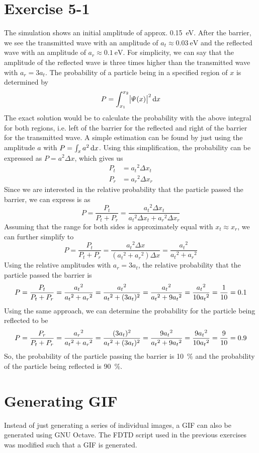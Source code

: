 \clearpage



\newpage
\section{Exercise 5-1}

The simulation shows an initial amplitude of approx. \SI{0.15}{\eV}. After
the barrier, we see the transmitted wave with an amplitude of
$a_t \approx \SI{0.03}{\eV}$ and the reflected wave with an amplitude of
$a_r \approx \SI{0.1}{\eV}$. For simplicity, we can say that the amplitude
of the reflected wave is three times higher than the transmitted wave with
$a_r = 3 a_t$.
%
The probability of a particle being in a specified region of $x$ is
determined by
%
\[
	P = \int_{x_1}^{x_2} \abs{\varPsi(x)}^2 \dif x
\]
%
The exact solution would be to calculate the probability with the above
integral for both regions, i.e. left of the barrier for the reflected and
right of the barrier for the transmitted wave. A simple estimation can be
found by just using the amplitude $a$ with $P = \int_{x} a^2 \dif x$. Using
this simplification, the probability can be expressed as $P = a^2 \Delta x$,
which gives us
\begin{align*}
	P_t &= {a_t}^2 \Delta x_t \\
	P_r &= {a_r}^2 \Delta x_r
\end{align*}
Since we are interested in the relative probability that the particle passed
the barrier, we can express is as
\[
	P
	= \frac{P_t}{P_t + P_r}
	= \frac{{a_t}^2 \Delta x_t}{{a_t}^2 \Delta x_t + {a_r}^2 \Delta x_r}
\]
Assuming that the range for both sides is approximately equal with
$x_t \approx x_r$, we can further simplify to
\[
	P
	= \frac{P_t}{P_t + P_r}
	= \frac{{a_t}^2 \Delta x}{({a_t}^2 + {a_r}^2) \Delta x}
	= \frac{{a_t}^2}{{a_t}^2 + {a_r}^2}
\]
Using the relative amplitudes with $a_r = 3 a_t$, the relative probability
that the particle passed the barrier is
\[
	P
	= \frac{P_t}{P_t + P_r}
	= \frac{{a_t}^2}{{a_t}^2 + {a_r}^2}
	= \frac{{a_t}^2}{{a_t}^2 + (3 a_t)^2}
	= \frac{{a_t}^2}{{a_t}^2 + 9 {a_t}^2}
	= \frac{{a_t}^2}{10 {a_t}^2}
	= \frac{1}{10}
	= 0.1 \\
\]
Using the same approach, we can determine the probability for the particle
being reflected to be
\[
	P
	= \frac{P_r}{P_t + P_r}
	= \frac{{a_r}^2}{{a_t}^2 + {a_r}^2}
	= \frac{(3 a_t)^2}{{a_t}^2 + (3 a_t)^2}
	= \frac{9 {a_t}^2}{{a_t}^2 + 9 {a_t}^2}
	= \frac{9 {a_t}^2}{10 {a_t}^2}
	= \frac{9}{10}
	= 0.9 \\
\]
So, the probability of the particle passing the barrier is \SI{10}{\percent}
and the probability of the particle being reflected is \SI{90}{\percent}.

\newpage
\section{Generating GIF}
Instead of just generating a series of individual images, a GIF can also
be generated using GNU Octave. The FDTD script used in the previous exercises
was modified such that a GIF is generated.

